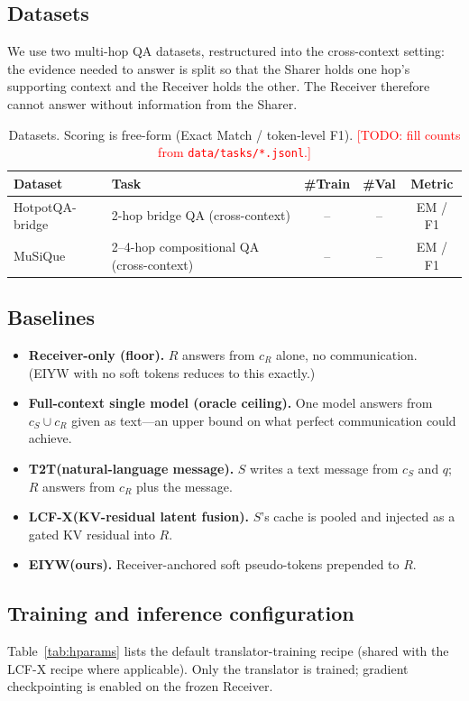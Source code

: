 \documentclass[11pt]{article}
\newcommand{\method}{\textsc{EIYW}\xspace}      %
\newcommand{\lcfx}{\textsc{LCF-X}\xspace}        %
\newcommand{\ttt}{\textsc{T2T}\xspace}           %
\newcommand{\sharer}{\textsf{Sharer}\xspace}
\newcommand{\receiver}{\textsf{Receiver}\xspace}
\newcommand{\TODO}[1]{\textcolor{red}{[TODO: #1]}}
\newcommand{\res}{--}                             %
\begin{document}
\subsection{Datasets}
We use two multi-hop QA datasets, restructured into the cross-context setting:
the evidence needed to answer is split so that the \sharer holds one hop's
supporting context and the \receiver holds the other. The \receiver therefore
cannot answer without information from the \sharer.

\begin{table}[h]
  \centering
  \caption{Datasets. Scoring is free-form (Exact Match / token-level F1).
  \TODO{fill counts from \texttt{data/tasks/*.jsonl}.}}
  \label{tab:datasets}
  \begin{tabular}{llccc}
    \toprule
    Dataset & Task & \#Train & \#Val & Metric \\
    \midrule
    HotpotQA-bridge & 2-hop bridge QA (cross-context) & \res & \res & EM / F1 \\
    MuSiQue         & 2--4-hop compositional QA (cross-context) & \res & \res & EM / F1 \\
    \bottomrule
  \end{tabular}
\end{table}

\subsection{Baselines}
\begin{itemize}
  \item \textbf{Receiver-only (floor).} $R$ answers from $c_R$ alone, no
  communication. (\method with no soft tokens reduces to this exactly.)
  \item \textbf{Full-context single model (oracle ceiling).} One model answers
  from $c_S\cup c_R$ given as text---an upper bound on what perfect
  communication could achieve.
  \item \textbf{\ttt (natural-language message).} $S$ writes a text message from
  $c_S$ and $q$; $R$ answers from $c_R$ plus the message.
  \item \textbf{\lcfx (KV-residual latent fusion).} $S$'s cache is pooled and
  injected as a gated KV residual into $R$.
  \item \textbf{\method (ours).} Receiver-anchored soft pseudo-tokens prepended
  to $R$.
\end{itemize}

\subsection{Training and inference configuration}
Table~\ref{tab:hparams} lists the default translator-training recipe (shared
with the \lcfx recipe where applicable). Only the translator is trained;
gradient checkpointing is enabled on the frozen \receiver.
\end{document}

